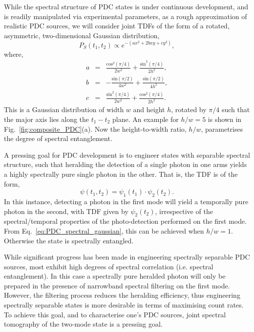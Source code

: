 \documentclass[aps,pra,twocolumn,amsmath,amssymb,color,superscriptaddress]{revtex4}
\begin{document}
While the spectral structure of PDC states is under continuous development, and is readily manipulated via experimental parameters, as a rough approximation of realistic PDC sources, we will consider joint TDFs of the form of a rotated, asymmetric, two-dimensional Gaussian distribution,
\begin{equation} \label{eq:PDC_spectral_gaussian}
P_S(t_1,t_2) \propto e^{-(a x^2 + 2 b x y + c y^2)},
\end{equation}
where,
\begin{eqnarray}
a &=& \frac{\mathrm{cos}^2(\pi/4)}{2 w^2} + \frac{\mathrm{sin}^2(\pi/4)}{2 h^2}, \nonumber \\
b &=& -\frac{\mathrm{sin}(\pi/2)}{4 w^2} + \frac{\mathrm{sin}(\pi/2)}{4 h^2}, \nonumber \\
c &=& \frac{\mathrm{sin}^2(\pi/4)}{2 w^2} + \frac{\mathrm{cos}^2(\pi/4)}{2 h^2}.
\end{eqnarray}
This is a Gaussian distribution of width $w$ and height $h$, rotated by $\pi/4$ such that the major axis lies along the \mbox{$t_1-t_2$} plane. An example for \mbox{$h/w=5$} is shown in Fig.~\ref{fig:composite_PDC}(a). Now the height-to-width ratio, \mbox{$h/w$}, parametrises the degree of spectral entanglement.

A pressing goal for PDC development is to engineer states with separable spectral structure, such that heralding the detection of a single photon in one arms yields a highly spectrally pure single photon in the other. That is, the TDF is of the form,
\begin{equation}
\psi(t_1,t_2) = \psi_1(t_1) \cdot \psi_2(t_2).
\end{equation}
In this instance, detecting a photon in the first mode will yield a temporally pure photon in the second, with TDF given by $\psi_2(t_2)$, irrespective of the spectral/temporal properties of the photo-detection performed on the first mode. From Eq.~\ref{eq:PDC_spectral_gaussian}, this can be achieved when $h/w=1$. Otherwise the state is spectrally entangled.

While significant progress has been made in engineering spectrally separable PDC sources, most exhibit high degrees of spectral correlation (i.e. spectral entanglement). In this case a spectrally pure heralded photon will only be prepared in the presence of narrowband spectral filtering on the first mode. However, the filtering process reduces the heralding efficiency, thus engineering spectrally separable states is more desirable in terms of maximising count rates. To achieve this goal, and to characterise one's PDC sources, joint spectral tomography of the two-mode state is a pressing goal.
\end{document}
